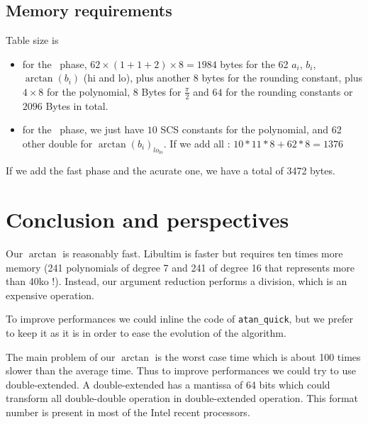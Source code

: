 \subsection{Memory requirements}
Table size is
\begin{itemize}
\item for the \quick\ phase,
  $62\times (1+1+2) \times8=1984$ bytes for the 62 $a_i$, $b_i$,
  $\arctan(b_i)$ (hi and lo), plus another $8$ bytes for the rounding
  constant, plus $4\times8$ for the polynomial, $8$ Bytes for
  $\frac{\pi}{2}$ and $64$ for the rounding constants or $2096$ Bytes in
  total.
  
\item for the \accurate\ phase, we just have $10$ SCS constants for the
  polynomial, and 62 other double for $\arctan(b_i)_{lo_{lo}}$.
  If we add all : $10*11*8 + 62*8 = 1376$
\end{itemize}
If we add the fast phase and the acurate one, we have a total of 3472
bytes. 


\section{Conclusion and perspectives}

Our $\arctan$ is reasonably fast.  Libultim is faster but requires ten
times more memory (241 polynomials of degree 7 and 241 of degree 16
that represents more than 40ko !). Instead, our argument reduction
performs a division, which is an expensive operation.

To improve performances we could inline the code of \texttt{atan\_quick},
but we prefer to keep it as it is in order to ease the evolution of the
algorithm.

The main problem of our $\arctan$ is the worst case time which is about 100
times slower than the average time. Thus to improve performances we could
try to use double-extended. A double-extended has a mantissa of 64 bits
which could transform all double-double operation in double-extended
operation. This format number is present in most of the Intel recent
processors.
